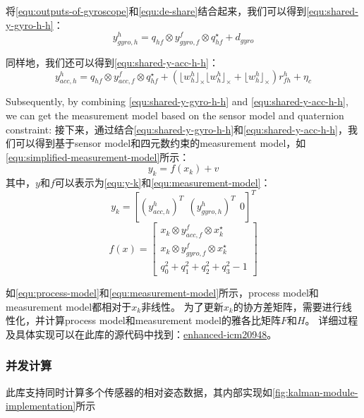 将\autoref{equ:outputs-of-gyroscope}和\autoref{equ:de-share}结合起来，我们可以得到\autoref{equ:shared-y-gyro-h-h}：
\begin{equation}
    \label{equ:shared-y-gyro-h-h}
    y_{gyro,h}^h = q_{hf} \otimes y_{gyro,f}^f \otimes q_{hf}^{\star} + d_{gyro}
\end{equation}

同样地，我们还可以得到\autoref{equ:shared-y-acc-h-h}：
\begin{equation}
    \label{equ:shared-y-acc-h-h}
    y_{acc,h}^h = q_{hf} \otimes y_{acc,f}^f \otimes q_{hf}^{\star} + (\lfloor w_h^h \rfloor_{\times} \lfloor w_h^h \rfloor_{\times} + \lfloor w_h^h \rfloor_{\times})r_{fh}^h  + \eta_c
\end{equation}

Subsequently, by combining \autoref{equ:shared-y-gyro-h-h} and \autoref{equ:shared-y-acc-h-h}, we can get the measurement model based on the sensor model and quaternion constraint:
接下来，通过结合\autoref{equ:shared-y-gyro-h-h}和\autoref{equ:shared-y-acc-h-h}，我们可以得到基于sensor model和四元数约束的measurement model，如\autoref{equ:simplified-measurement-model}所示：
\begin{equation}
    \label{equ:simplified-measurement-model}
    y_k = f(x_k) + v
\end{equation}
其中，$y$和$f$可以表示为\autoref{equ:y-k}和\autoref{equ:measurement-model}：
\begin{equation}
    \label{equ:y-k}
    y_k = {[{(y_{acc,h}^h)}^T\ \ {(y_{gyro,h}^h)}^T\ \ 0]}^T
\end{equation}
\begin{equation}
    \label{equ:measurement-model}
    f(x) = \begin{bmatrix}
        x_k \otimes y_{acc,f}^f \otimes x_k^{\star} \\
        x_k \otimes y_{gyro,f}^f \otimes x_k^{\star} \\
        q_0^2 + q_1^2 + q_2^2 + q_3^2 - 1
    \end{bmatrix}
\end{equation}

如\autoref{equ:process-model}和\autoref{equ:measurement-model}所示，process model和measurement model都相对于$x_k$非线性。
为了更新$x_k$的协方差矩阵，需要进行线性化，并计算process model和measurement model的雅各比矩阵$F$和$H$。
详细过程及具体实现可以在此库的源代码中找到：\href{https://pypi.org/project/enhanced-icm20948/}{enhanced-icm20948}。
\subsubsection{并发计算}
此库支持同时计算多个传感器的相对姿态数据，其内部实现如\autoref{fig:kalman-module-implementation}所示

